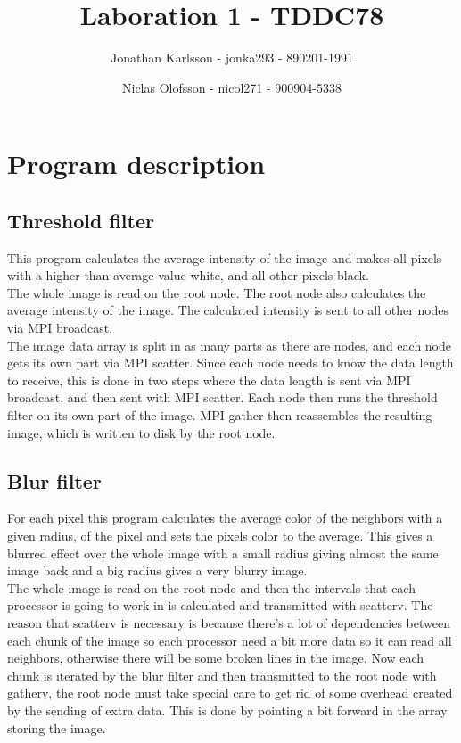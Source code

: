\documentclass[a4paper]{article}
\author{Jonathan Karlsson - jonka293 - 890201-1991 \and Niclas Olofsson - nicol271 - 900904-5338}
\title{Laboration 1 - TDDC78}
\begin{document}
\maketitle

\section{Program description}
\subsection{Threshold filter}

This program calculates the average intensity of the image and makes all
pixels with a higher-than-average value white, and all other pixels
black.\\

The whole image is read on the root node. The root node also calculates
the  average intensity of the image. The calculated intensity is sent to
all other nodes via MPI broadcast.\\

The image data array is split in as many parts as there are nodes, and
each node gets its own part via MPI scatter. Since each node needs to
know  the data length to receive, this is done in two steps where the
data length is  sent via MPI broadcast, and then sent with MPI scatter.
Each node then runs the threshold filter on its own part of the image.
MPI gather then reassembles the resulting image, which is written to
disk by the root node.\\

\subsection{Blur filter}
For each pixel this program calculates the average color of the neighbors with a given radius, of the pixel and sets the pixels color to the average. This gives a blurred effect over the whole image with a small radius giving almost the same image back and a big radius gives a very blurry image.\\

 The whole image is read on the root node and then the intervals that each processor is going to work in is calculated and transmitted with scatterv. The reason that scatterv is necessary is because there\rq{}s a lot of dependencies between each chunk of the image so each processor need a bit more data so it can read all neighbors, otherwise there will be some broken lines in the image. Now each chunk is iterated by the blur filter and then transmitted to the root node with gatherv, the root node must take special care to get rid of some overhead created by the sending of extra data. This is done by pointing a bit forward in the array storing the image.
\end{document}
